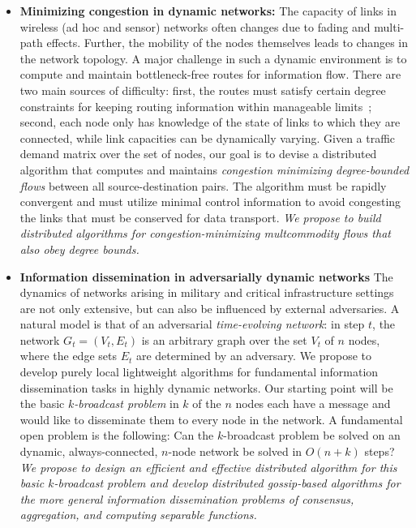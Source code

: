 \begin{itemize}
\item
{\bf Minimizing congestion in dynamic networks:} The capacity of links
in wireless (ad hoc and sensor) networks often changes due to fading
and multi-path effects.  Further, the mobility of the nodes themselves
leads to changes in the network topology.  A major challenge in such a
dynamic environment is to compute and maintain bottleneck-free routes
for information flow.  There are two main sources of difficulty:
first, the routes must satisfy certain degree constraints for keeping
routing information within manageable limits~\cite{chen+rs:flow};
second, each node only has knowledge of the state of links to which
they are connected, while link capacities can be dynamically varying.
Given a traffic demand matrix over the set of nodes, our goal is to
devise a distributed algorithm that computes and maintains {\em
  congestion minimizing degree-bounded flows}\/ between all
source-destination pairs.  The algorithm must be rapidly convergent
and must utilize minimal control information to avoid congesting the
links that must be conserved for data transport. {\em We propose to
  build distributed algorithms for congestion-minimizing multcommodity
  flows that also obey degree bounds.}

\item
{\bf Information dissemination in adversarially dynamic networks} The
dynamics of networks arising in military and critical infrastructure
settings are not only extensive, but can also be influenced by
external adversaries.  A natural model is that of an adversarial {\em
  time-evolving network}: in step $t$, the network $G_t = (V_t, E_t)$
is an arbitrary graph over the set $V_t$ of $n$ nodes, where the edge
sets $E_t$ are determined by an adversary.  We propose to develop
purely local lightweight algorithms for fundamental information
dissemination tasks in highly dynamic networks.  Our starting point
will be the basic {\em $k$-broadcast problem} in $k$ of the $n$ nodes
each have a message and would like to disseminate them to every node
in the network.  A fundamental open problem is the following: Can the
$k$-broadcast problem be solved on an dynamic, always-connected,
$n$-node network be solved in $O(n + k)$ steps? {\em We propose to
  design an efficient and effective distributed algorithm for this
  basic $k$-broadcast problem and develop distributed gossip-based
  algorithms for the more general information dissemination problems
  of consensus, aggregation, and computing separable functions.}


\end{itemize}

